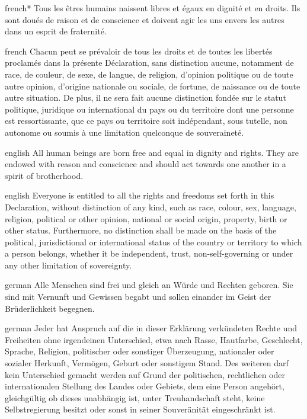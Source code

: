 \documentclass{article}
\begin{document}
\begin{conditext}{french}*
Tous les êtres humains naissent libres et égaux en dignité et en
droits. Ils sont doués de raison et de conscience et doivent agir
les uns envers les autres dans un esprit de fraternité.
\end{conditext}
\begin{conditext}{french}
Chacun peut se prévaloir de tous les droits et de toutes les libertés
proclamés dans la présente Déclaration, sans distinction aucune,
notamment de race, de couleur, de sexe, de langue, de religion, d’opinion
politique ou de toute autre opinion, d’origine nationale ou sociale,
de fortune, de naissance ou de toute autre situation.
De plus, il ne sera fait aucune distinction fondée sur le statut
politique, juridique ou international du pays ou du territoire dont
une personne est ressortissante, que ce pays ou territoire soit indépendant,
sous tutelle, non autonome ou soumis à une limitation quelconque
de souveraineté.
\end{conditext}

\begin{conditext}{english}
All human beings are born free and equal in dignity and rights. They
are endowed with reason and conscience and should act towards one
another in a spirit of brotherhood.
\end{conditext}
\begin{conditext}{english}
Everyone is entitled to all the rights and freedoms set forth in
this Declaration, without distinction of any kind, such as race,
colour, sex, language, religion, political or other opinion, national
or social origin, property, birth or other status.
Furthermore, no distinction shall be made on the basis of the political,
jurisdictional or international status of the country or territory
to which a person belongs, whether it be independent, trust, non-self-governing
or under any other limitation of sovereignty.
\end{conditext}

\begin{conditext}{german}
Alle Menschen sind frei und gleich an Würde und Rechten geboren.
Sie sind mit Vernunft und Gewissen begabt und sollen einander im
Geist der Brüderlichkeit begegnen.
\end{conditext}
\begin{conditext}{german}
Jeder hat Anspruch auf die in dieser Erklärung verkündeten Rechte
und Freiheiten ohne irgendeinen Unterschied, etwa nach Rasse, Hautfarbe,
Geschlecht, Sprache, Religion, politischer oder sonstiger Überzeugung,
nationaler oder sozialer Herkunft, Vermögen, Geburt oder sonstigem
Stand.
Des weiteren darf kein Unterschied gemacht werden auf Grund der politischen,
rechtlichen oder internationalen Stellung des Landes oder Gebiets,
dem eine Person angehört, gleichgültig ob dieses unabhängig ist,
unter Treuhandschaft steht, keine Selbstregierung besitzt oder sonst
in seiner Souveränität eingeschränkt ist.
\end{conditext}
\end{document}
